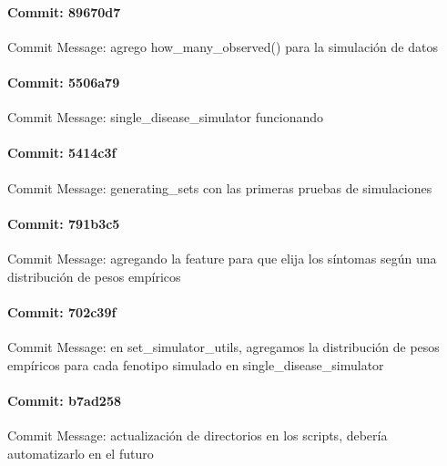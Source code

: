 \documentclass{article}
\begin{document}
\paragraph{Commit: 89670d7}
Commit Message: agrego how_many_observed() para la simulación de datos

\paragraph{Commit: 5506a79}
Commit Message: single_disease_simulator funcionando

\paragraph{Commit: 5414c3f}
Commit Message: generating_sets con las primeras pruebas de simulaciones

\paragraph{Commit: 791b3c5}
Commit Message: agregando la feature para que elija los síntomas según una distribución de pesos empíricos

\paragraph{Commit: 702c39f}
Commit Message: en set_simulator_utils, agregamos la distribución de pesos empíricos para cada fenotipo simulado en single_disease_simulator

\paragraph{Commit: b7ad258}
Commit Message: actualización de directorios en los scripts, debería automatizarlo en el futuro

\end{document}
